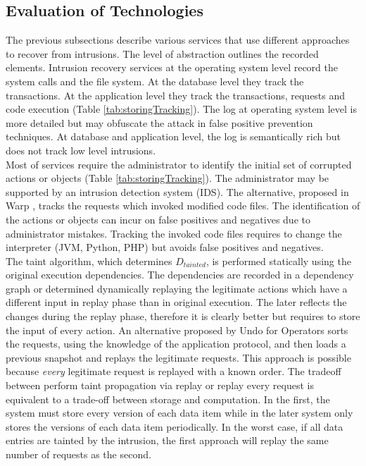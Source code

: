\subsection{Evaluation of Technologies}
\label{sec:Discuss}
The previous subsections describe various services that use different approaches to recover from intrusions. The level of abstraction outlines the recorded elements. Intrusion recovery services at the operating system level record the system calls and the file system. At the database level they track the transactions. At the application level they track the transactions, requests and code execution (Table \ref{tab:storingTracking}). The log at operating system level is more detailed but may obfuscate the attack in false positive prevention techniques. At database and application level, the log is semantically rich but does not track low level intrusions.\\


Most of services require the administrator to identify the initial set of corrupted actions or objects (Table \ref{tab:storingTracking}). The administrator may be supported by an intrusion detection system (IDS). The alternative, proposed in Warp \cite{warp}, tracks the requests which invoked modified code files. The identification of the actions or objects can incur on false positives and negatives due to administrator mistakes. Tracking the invoked code files requires to change the interpreter (JVM, Python, PHP) but avoids false positives and negatives.\\

The taint algorithm, which determines $D_{tainted}$, is performed statically using the original execution dependencies. The dependencies are recorded in a dependency graph or determined dynamically replaying the legitimate actions which have a different input in replay phase than in original execution. The later reflects the changes during the replay phase, therefore it is clearly better but requires to store the input of every action. An alternative proposed by Undo for Operators \cite{undoForOperators} sorts the requests, using the knowledge of the application protocol, and then loads a previous snapshot and replays the legitimate requests. This approach is possible because \textit{every} legitimate request is replayed with a known order. The tradeoff between perform taint propagation via replay or replay every request is equivalent to a trade-off between storage and computation. In the first, the system must store every version of each data item while in the later system only stores the versions of each data item periodically. In the worst case, if all data entries are tainted by the intrusion, the first approach will replay the same number of requests as the second. 


